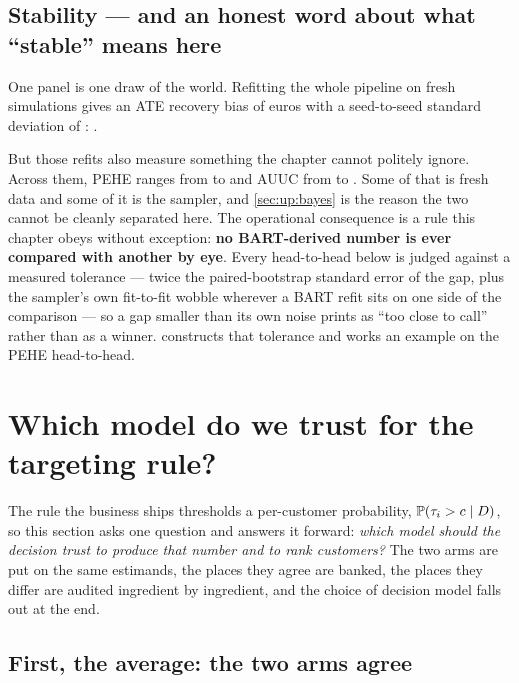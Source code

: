 


\subsection*{Stability --- and an honest word about what ``stable'' means here}

One panel is one draw of the world. Refitting the whole pipeline on \nbOneNSeeds{} fresh
simulations gives an ATE recovery bias of \nbOneStabBias{} euros with a seed-to-seed standard
deviation of \eur{\nbOneStabSd}: \nbOneStabVerdict.

But those \nbOneNSeeds{} refits also measure something the chapter cannot politely ignore. Across
them, PEHE ranges from \eur{\nbOneStabPeheLo} to \eur{\nbOneStabPeheHi} and AUUC from
\nbOneStabAuucLo{} to \nbOneStabAuucHi. Some of that is fresh data and some of it is the sampler,
and \cref{sec:up:bayes} is the reason the two cannot be cleanly separated here. The operational
consequence is a rule this chapter obeys without exception: \textbf{no BART-derived number is ever
compared with another by eye}. Every head-to-head below is judged against a measured tolerance ---
twice the paired-bootstrap standard error of the gap, plus the sampler's own fit-to-fit wobble
wherever a BART refit sits on one side of the comparison --- so a gap smaller than its own noise
prints as ``too close to call'' rather than as a winner.  constructs that
tolerance and works an example on the PEHE head-to-head.

\section{Which model do we trust for the targeting rule?}
\label{sec:up:compare}



The rule the business ships thresholds a per-customer probability, $\operatorname{\mathbb{P}}(\tau_i > c \mid D)$, so
this section asks one question and answers it forward: \emph{which model should the decision trust
to produce that number and to rank customers?} The two arms are put on the same estimands, the
places they agree are banked, the places they differ are audited ingredient by ingredient, and the
choice of decision model falls out at the end.

\subsection*{First, the average: the two arms agree}

